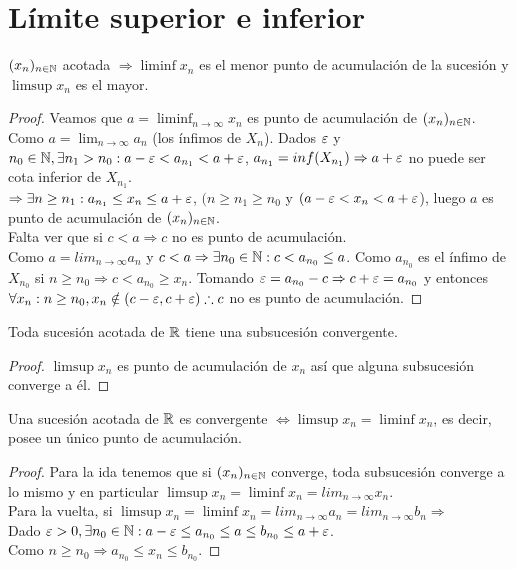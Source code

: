 \section{Límite superior e inferior}

\begin{theorem}
  $(x_n)_{n \in \mathbb{N}}$ acotada $\Rightarrow \liminf x_n$ es el menor punto de acumulación de la sucesión y $\limsup x_n$ es el mayor.

  \begin{proof}
    Veamos que $a = \liminf_{n \to \infty} x_n$ es punto de acumulación de $(x_n)_{n \in \mathbb{N}}$. \\
    Como $a = \lim_{n \to \infty} a_n$ (los ínfimos de $X_n$). Dados $\varepsilon$ y $n_0 \in \mathbb{N}, \exists n_1 > n_0 : a-\varepsilon < a_{n_1} < a+\varepsilon$, $a_{n_1} = inf(X_{n_1}) \Rightarrow a + \varepsilon$ no puede ser cota inferior de $X_{n_1}$. \\
    $\Rightarrow \exists n \geq n_1 : a_{n_1} \leq x_n \leq a+\varepsilon$, $(n \geq n_1 \geq n_0$ y $(a - \varepsilon < x_n < a + \varepsilon$), luego $a$ es punto de acumulación de $(x_n)_{n \in \mathbb{N}}$. \\
    Falta ver que si $c < a \Rightarrow c$ no es punto de acumulación. \\
    Como $a = lim_{n \to \infty} a_n$ y $c < a \Rightarrow \exists n_0 \in \mathbb{N} : c < a_{n_0} \leq a$. Como $a_{n_0}$ es el ínfimo de $X_{n_0}$ si $n \geq n_0 \Rightarrow c < a_{n_0} \geq x_n$. Tomando $\varepsilon = a_{n_0} - c \Rightarrow c+\varepsilon = a_{n_0}$ y entonces $\forall x_n: n \geq n_0, x_n \notin (c - \varepsilon, c + \varepsilon) \therefore c$ no es punto de acumulación.
  \end{proof}
\end{theorem}

\begin{theorem}
  Toda sucesión acotada de $\mathbb{R}$ tiene una subsucesión convergente.
  \begin{proof}
    $\limsup x_n$ es punto de acumulación de $x_n$ así que alguna subsucesión converge a él.
  \end{proof}
\end{theorem}

\begin{corollary}
  Una sucesión acotada de $\mathbb{R}$ es convergente $\iff \limsup x_n = \liminf x_n$, es decir, posee un único punto de acumulación.
  \begin{proof}
    Para la ida tenemos que si $(x_n)_{n \in \mathbb{N}}$ converge, toda subsucesión converge a lo mismo y en particular $\limsup x_n = \liminf x_n = lim_{n \to \infty} x_n$. \\
    Para la vuelta, si $\limsup x_n = \liminf x_n = lim_{n \to \infty} a_n = lim_{n \to \infty} b_n \Rightarrow$ \\
    Dado $\varepsilon > 0, \exists n_0 \in \mathbb{N} : a - \varepsilon \leq a_{n_0} \leq a \leq b_{n_0} \leq a + \varepsilon$. \\
    Como $n \geq n_0 \Rightarrow a_{n_0} \leq x_n \leq b_{n_0}$.
  \end{proof}
\end{corollary}

